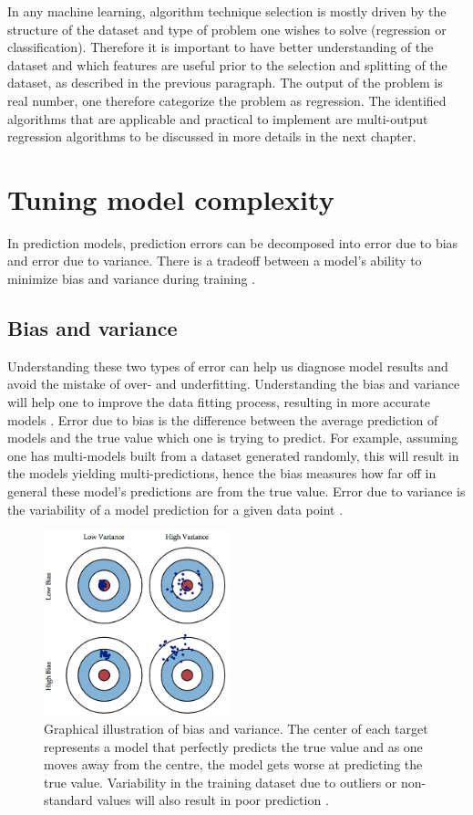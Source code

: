 In any machine learning, algorithm technique selection is mostly driven by the structure of the dataset and type of problem one wishes to solve (regression or classification). Therefore it is important to have better understanding of the dataset and which features are useful prior to the selection and splitting of the dataset, as described in the previous paragraph. The output of the problem is real number, one therefore categorize the problem as regression. The identified algorithms that are applicable and practical to implement are multi-output regression algorithms to be discussed in more details in the next chapter. 


\section{Tuning model complexity}
\label{comp}
In prediction models, prediction errors can be decomposed into error due to bias and error due to variance. There is a tradeoff between a model's ability to minimize bias and variance during training \citep{fortmann2012understanding}. 
\subsection{Bias and variance }
Understanding these two types of error can help us diagnose model results and avoid the mistake of over- and underfitting. Understanding the bias and variance will help one to improve the data fitting process, resulting in more accurate models \citep{fortmann2012understanding}.
Error due to bias is the difference between the average prediction of  models and the true value which one is trying to predict. For example, assuming one has multi-models built from a dataset generated randomly, this will result in the models yielding multi-predictions, hence the bias measures how far off in general these model's predictions are from the true value. Error due to variance is the variability of a model prediction for a given data point \citep{fortmann2012understanding}. 

\begin{figure}[H]
  \centering
    \includegraphics[width=0.48\textwidth]{images/Bias.png}
    \caption{Graphical illustration of bias and variance. The center of each target represents a model that perfectly predicts the true value and as one moves away from the centre, the model gets worse at predicting the true value. Variability in the training dataset due to outliers or non-standard values will also result in poor prediction \citep{fortmann2012understanding}.}
  \label{RC}
 \end{figure}
 
